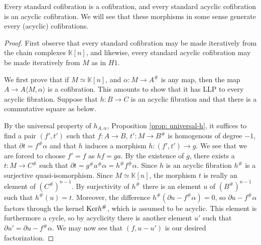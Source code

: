 \documentclass[../thesis.tex]{subfiles}
\begin{document}
            \begin{proposition}
                Every standard cofibration is a cofibration, and every standard acyclic cofibration is an acyclic cofibration. We will see that these morphisms in some sense generate every (acyclic) cofibrations.
            \end{proposition}

            \begin{proof}
                First observe that every standard cofibration may be made iteratively from the chain complexes $\mathbb{K}[n]$, and likewise, every standard acyclic cofibration may be made iteratively from $M$ as in $H1$.

                We first prove that if $M \simeq \mathbb{K}[n]$, and $\alpha : M \rightarrow A^\#$ is any map, then the map $A \rightarrow A\langle M,\alpha\rangle$ is a cofibration. This amounts to show that it has LLP to every acyclic fibration. Suppose that $h: B \rightarrow C$ is an acyclic fibration and that there is a commutative square as below.
                \begin{center}
                \end{center}
                
                By the universal property of $h_{A,\alpha}$, Proposition \ref{prop: universal-h}, it suffices to find a pair $(f',t')$ such that $f: A \rightarrow B$, $t' : M \rightarrow B^\#$ is homogenous of degree $-1$, that $\partial t = f^\#\alpha$ and that $h$ induces a morphism $h : (f',t') \rightarrow g$. We see that we are forced to choose $f' = f$ as $hf = ga$. By the existence of $g$, there exists a $t : M \rightarrow C^\#$ such that $\partial t = g^\#a^\#\alpha = h^\#f^\#\alpha$. Since $h$ is an acyclic fibration $h^\#$ is a surjective quasi-isomorphism. Since $M \simeq \mathbb{K}[n]$, the morphism $t$ is really an element of $(C^{\#})^{n-1}$. By surjectivity of $h^\#$ there is an element $u$ of $(B^{\#})^{n-1}$ such that $h^\#(u) = t$. Moreover, the difference $h^\#(\partial u - f^\#\alpha) = 0$, so $\partial u - f^\#\alpha$ factors through the kernel $\tt{Ker} h^\#$, which is assumed to be acyclic. This element is furthermore a cycle, so by acyclicity there is another element $u'$ such that $\partial u' = \partial u - f^\#\alpha$. We may now see that $(f, u - u')$ is our desired factorization.
                

\end{proof}
\end{document}
